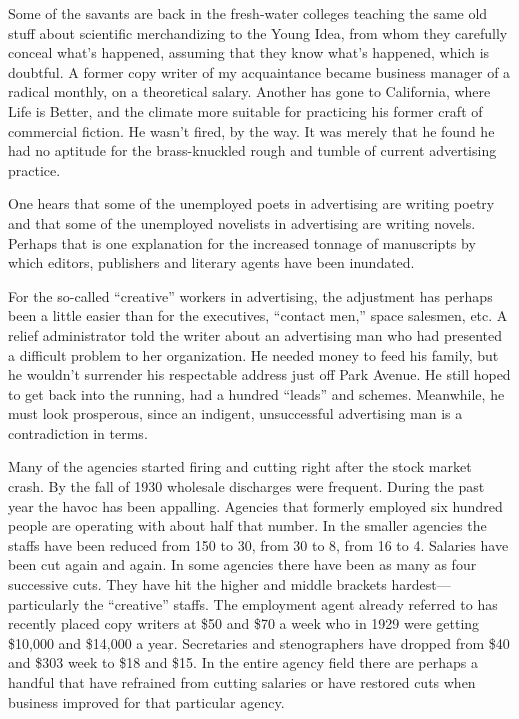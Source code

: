 \documentclass[twoside,nohyper,openany,nobib]{tufte-book}
\begin{document}
Some of the savants are back in the fresh-water colleges teaching the
same old stuff about scientific merchandizing to the Young Idea, from
whom they carefully conceal what's happened, assuming that they know
what's happened, which is doubtful.
\clearpage
A former copy writer of my acquaintance became business manager of a
radical monthly, on a theoretical salary. Another has gone to
California, where Life is Better, and the climate more suitable for
practicing his former craft of commercial fiction. He wasn't fired, by
the way. It was merely that he found he had no aptitude for the
brass-knuckled rough and tumble of current advertising practice.

One hears that some of the unemployed poets in advertising are writing
poetry and that some of the unemployed novelists in advertising are
writing novels. Perhaps that is one explanation for the increased
tonnage of manuscripts by which editors, publishers and literary agents
have been inundated.

For the so-called ``creative'' workers in advertising, the adjustment
has perhaps been a little easier than for the executives, ``contact
men,'' space salesmen, etc. A relief administrator told the writer about
an advertising man who had presented a difficult problem to her
organization. He needed money to feed his family, but he wouldn't
surrender his respectable address just off Park Avenue. He still hoped
to get back into the running, had a hundred ``leads'' and schemes.
Meanwhile, he must look prosperous, since an indigent, unsuccessful
advertising man is a contradiction in terms.

Many of the agencies started firing and cutting right after the stock
market crash. By the fall of 1930 wholesale discharges were frequent.
During the past year the havoc has been appalling. Agencies that
formerly employed six hundred people are operating with about half that
number. In the smaller agencies the staffs have been reduced from 150 to
30, from 30 to 8, from 16 to 4. Salaries have been cut again and again.
In some agencies there have been as many as four successive cuts. They
have hit the higher and middle brackets hardest---particularly the
``creative'' staffs. The employment agent already referred to has
recently placed copy writers at \$50 and \$70 a week who in 1929 were
getting \$10,000 and \$14,000 a year. Secretaries and stenographers have
dropped from \$40 and \$303 week to \$18 and \$15. In the entire agency
field there are perhaps a handful that have refrained from cutting
salaries or have restored cuts when business improved for that
particular agency.
\end{document}
